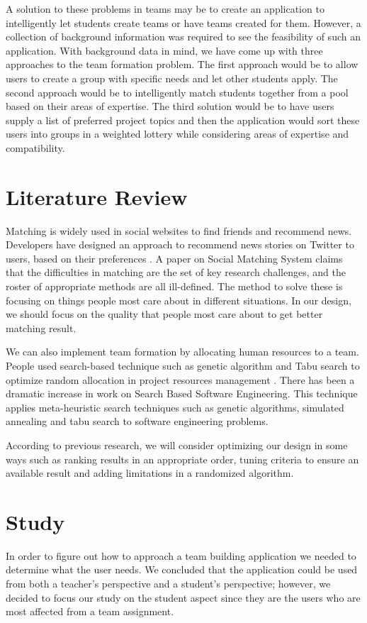 \documentclass[conference]{IEEEtran}
\begin{document}
A solution to these problems in teams may be to create an application to intelligently let students create teams or have teams created for them. However,
a collection of background information was required to see the feasibility of such an application. With background data in mind, we have come up with three
approaches to the team formation problem. The first approach would be to allow users to create a group with specific needs and let other students apply.
The second approach would be to intelligently match students together from a pool based on their areas of expertise. The third solution would be to 
have users supply a list of preferred project topics and then the application would sort these users into groups in a weighted lottery while considering
areas of expertise and compatibility.

\section{Literature Review}
Matching is widely used in social websites to find friends and recommend news. Developers have designed an approach to recommend news stories on Twitter to users, based on their preferences \cite{twitter}. A paper on Social Matching System claims that the difficulties in matching are the set of key research challenges, and the roster of appropriate methods are all ill-defined. The method to solve these is focusing on things people most care about in different situations. In our design, we should focus on the quality that people most care about to get better matching result.

We can also implement team formation by allocating human resources to a team. People used search-based technique such as genetic algorithm and Tabu search to optimize random allocation in project resources management \cite{searchbased}. There has been a dramatic increase in work on Search Based Software Engineering. This technique applies meta-heuristic search techniques such as genetic algorithms, simulated annealing and tabu search to software engineering problems. 

According to previous research, we will consider optimizing our design in some ways such as ranking results in an appropriate order, tuning criteria to ensure an available result and adding limitations in a randomized algorithm.

\section{Study}
In order to figure out how to approach a team building application we needed
to determine what the user needs. We concluded that the
application could be used from both a teacher's perspective and a student's 
perspective; however, we decided to focus our study on the student aspect since
they are the users who are most affected from a team assignment.
\end{document}
